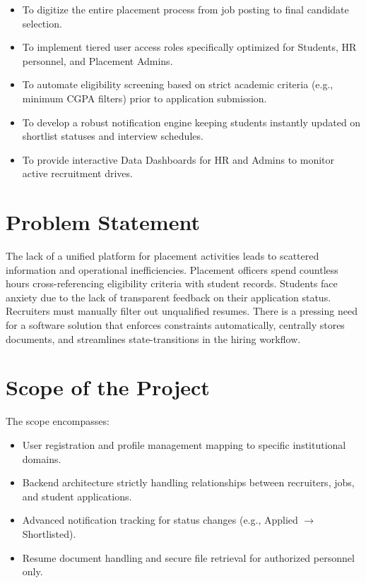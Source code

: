 \documentclass[a4paper,12pt]{report}
\begin{document}
\begin{itemize}
    \item To digitize the entire placement process from job posting to final candidate selection.
    \item To implement tiered user access roles specifically optimized for Students, HR personnel, and Placement Admins.
    \item To automate eligibility screening based on strict academic criteria (e.g., minimum CGPA filters) prior to application submission.
    \item To develop a robust notification engine keeping students instantly updated on shortlist statuses and interview schedules.
    \item To provide interactive Data Dashboards for HR and Admins to monitor active recruitment drives.
\end{itemize}

\section{Problem Statement}

The lack of a unified platform for placement activities leads to scattered information and operational inefficiencies. Placement officers spend countless hours cross-referencing eligibility criteria with student records. Students face anxiety due to the lack of transparent feedback on their application status. Recruiters must manually filter out unqualified resumes. There is a pressing need for a software solution that enforces constraints automatically, centrally stores documents, and streamlines state-transitions in the hiring workflow.

\section{Scope of the Project}

The scope encompasses:
\begin{itemize}
    \item User registration and profile management mapping to specific institutional domains.
    \item Backend architecture strictly handling relationships between recruiters, jobs, and student applications.
    \item Advanced notification tracking for status changes (e.g., Applied $\rightarrow$ Shortlisted).
    \item Resume document handling and secure file retrieval for authorized personnel only.
\end{itemize}
\end{document}
